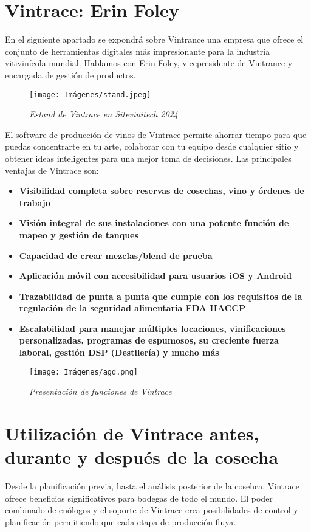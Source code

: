 \section{Vintrace: Erin Foley}

En el siguiente apartado se expondrá sobre Vintrance una empresa que ofrece el conjunto de herramientas digitales más impresionante para la industria vitivinícola mundial.
Hablamos con Erin Foley, vicepresidente de Vintrance y encargada de gestión de productos. 
\begin{figure}[h!]
    \centering
    \texttt{[image: Imágenes/stand.jpeg]}
    \caption{\textit{Estand de Vintrace en Sitevinitech 2024}}
    \label{exemploLabel}
    \end{figure}
El software de producción de vinos de Vintrace permite ahorrar tiempo para que puedas concentrarte en tu arte, colaborar con tu equipo desde cualquier sitio y obtener ideas inteligentes para una mejor toma de decisiones.
Las principales ventajas de Vintrace son:
\begin{itemize}
\item \textbf{Visibilidad completa sobre reservas de cosechas, vino y órdenes de trabajo}
\item \textbf{Visión integral de sus instalaciones con una potente función de mapeo y gestión de tanques}
\item \textbf{Capacidad de crear mezclas/blend de prueba}
\item \textbf{Aplicación móvil con accesibilidad para usuarios iOS y Android}
\item \textbf{Trazabilidad de punta a punta que cumple con los requisitos de la regulación de la seguridad alimentaria FDA HACCP}
\item \textbf{Escalabilidad para manejar múltiples locaciones, vinificaciones personalizadas, programas de espumosos, su creciente fuerza laboral, gestión DSP (Destilería) y mucho más}
\end{itemize}
 \begin{figure}[h!]
    \centering
    \texttt{[image: Imágenes/agd.png]}
    \caption{\textit{Presentación de funciones de Vintrace}}
    \label{exemploLabel}
    \end{figure}

    
\section{Utilización de Vintrace antes, durante y después de la cosecha}
Desde la planificación previa, hasta el análisis posterior de la cosehca, Vintrace ofrece beneficios significativos para bodegas de todo el mundo. El poder combinado de enólogos y el soporte de Vintrace crea posibilidades de control y planificación permitiendo que cada etapa de producción fluya.

